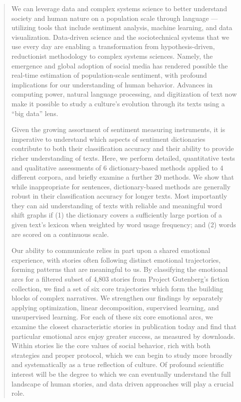 \begin{abstract}
  We can leverage data and complex systems science to better understand society and human nature on a population scale through language
  --- utilizing tools that include sentiment analysis,
  machine learning,
  and data visualization.
  Data-driven science and the sociotechnical systems that we use every day are enabling a transformation from
  hypothesis-driven, reductionist methodology
  to complex systems sciences.
  Namely, the emergence and global adoption of social media has rendered possible the real-time estimation of population-scale sentiment,
  with profound implications for our understanding of human behavior.
  Advances in computing power, natural language processing, and digitization of text now make it possible to study a culture's evolution through its texts using a ``big data'' lens.

  Given the growing assortment of sentiment measuring instruments,
it is imperative to understand which aspects of sentiment dictionaries contribute to both their
classification accuracy
and
their ability to provide richer understanding of texts.
Here, we perform detailed, quantitative tests and qualitative assessments of 6 dictionary-based methods
applied to 4 different corpora, and briefly examine a further 20 methods.
We show that while inappropriate for sentences, dictionary-based methods are generally robust in their classification accuracy for longer texts.
Most importantly they can aid understanding of texts
with reliable and meaningful word shift graphs if
(1)
the dictionary covers a sufficiently large
portion of a given text's lexicon when weighted by word usage frequency;
and
(2) 
words are scored on a continuous scale.

Our ability to communicate relies in part upon a shared emotional experience, with stories often following distinct emotional trajectories, forming patterns that are meaningful to us.
By classifying the emotional arcs for a filtered subset of 4,803 stories from Project Gutenberg's fiction collection, we find a set of six core trajectories which form the building blocks of complex narratives.
We strengthen our findings by separately applying optimization, linear decomposition, supervised learning, and unsupervised learning.
For each of these six core emotional arcs, we examine the closest characteristic stories in publication today and find that particular emotional arcs enjoy greater success, as measured by downloads.
Within stories lie the core values of social behavior, rich with both strategies and proper protocol, which we can begin to study more broadly and systematically as a true reflection of culture.
Of profound scientific interest will be the degree to which we can eventually understand the full landscape of human stories, and data driven approaches will play a crucial role.


\end{abstract}
